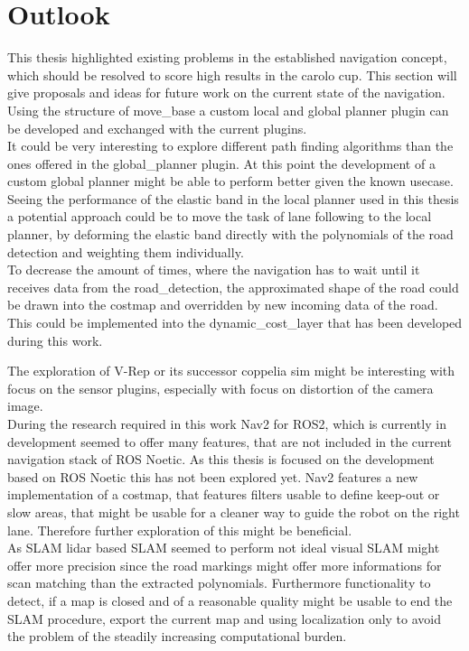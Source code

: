 \chapter{Outlook}
\label{outlook}

This thesis highlighted existing problems in the established navigation concept, which should be resolved to score high results in the carolo cup. This section will give proposals and ideas for future work on the current state of the navigation.\\

Using the structure of move\_base a custom local and global planner plugin can be developed and exchanged with the current plugins.\\

It could be very interesting to explore different path finding algorithms than the ones offered in the global\_planner plugin. At this point the development of a custom global planner might be able to perform better given the known usecase.\\

Seeing the performance of the elastic band in the local planner used in this thesis a potential approach could be to move the task of lane following to the local planner, by deforming the elastic band directly with the polynomials of the road detection and weighting them individually.\\

To decrease the amount of times, where the navigation has to wait until it receives data from the road\_detection, the approximated shape of the road could be drawn into the costmap and overridden by new incoming data of the road. This could be implemented into the dynamic\_cost\_layer that has been developed during this work.

The exploration of V-Rep or its successor coppelia sim might be interesting with focus on the sensor plugins, especially with focus on distortion of the camera image.\\

During the research required in this work Nav2 for ROS2, which is currently in development seemed to offer many features, that are not included in the current navigation stack of ROS Noetic. As this thesis is focused on the development based on ROS Noetic this has not been explored yet. Nav2 features a new implementation of a costmap, that features filters usable to define keep-out or slow areas, that might be usable for a cleaner way to guide the robot on the right lane. Therefore further exploration of this might be beneficial.\\

As SLAM lidar based SLAM seemed to perform not ideal visual SLAM might offer more precision since the road markings might offer more informations for scan matching than the extracted polynomials. Furthermore functionality to detect, if a map is closed and of a reasonable quality might be usable to end the SLAM procedure, export the current map and using localization only to avoid the problem of the steadily increasing computational burden.